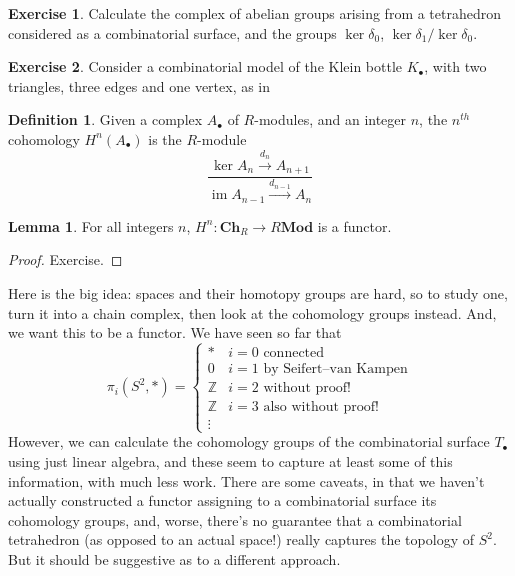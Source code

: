 \documentclass{tufte-handout}
\def\Mod {\mathbf{Mod}}
\def\Ch{\mathbf{Ch}}
\def\ZZ{\mathbb{Z}}
\DeclareMathOperator{\im}{im}
\theoremstyle{definition}
\newtheorem{lemma}{Lemma}
\newtheorem{definition}{Definition}
\newtheorem{ex}{Exercise}
\begin{document}
\begin{ex}
Calculate the complex of abelian groups arising from a tetrahedron considered as a combinatorial
surface, and the groups $\ker\delta_0$, $\ker\delta_1/\ker\delta_0$.
\end{ex}

\begin{ex}
Consider a combinatorial model of the Klein bottle $K_\bullet$, with two triangles, three edges and one vertex, as in

\end{ex}


\begin{definition}
Given a complex $A_\bullet$ of $R$-modules, and an integer $n$, the $n^{th}$ cohomology 
$H^n(A_\bullet)$ is the $R$-module
\[
\frac{\ker A_n \xrightarrow{d_n} A_{n+1}}{\im A_{n-1} \xrightarrow{d_{n-1}} A_n}
\]
\end{definition}

\begin{lemma}
For all integers $n$, $H^n \colon \Ch_R \to R\Mod$ is a functor.
\end{lemma}

\begin{proof}
Exercise.
\end{proof}

Here is the big idea: spaces and their homotopy groups are hard, so to study one, turn it into a chain complex, then 
look at the cohomology groups instead. And, we want this to be a functor. We have seen so far
that
\[
\pi_i(S^2,*) = \begin{cases}
* & i=0\text{ connected}\\
0 & i=1\text{ by Seifert--van~Kampen}\\
\ZZ & i=2\text{ without proof!}\\
\ZZ & i=3\text{ also without proof!}\\
\vdots &
\end{cases}
\]
However, we can calculate the cohomology groups of the combinatorial surface $T_\bullet$ using
just linear algebra, and these seem to capture at least some of this information, with much less
work. There are some caveats, in that we haven't actually constructed a functor assigning to
a combinatorial surface its cohomology groups, and, worse, there's no guarantee that a 
combinatorial tetrahedron (as opposed to an actual space!) really captures the topology of $S^2$.
But it should be suggestive as to a different approach.
\end{document}
